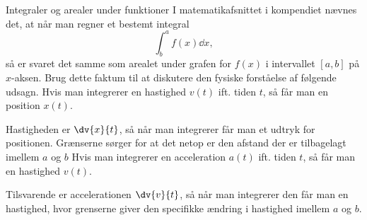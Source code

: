 %
\begin{opgave}{Integraler og arealer under funktioner}
I matematikafsnittet i kompendiet nævnes det, at når man regner et bestemt integral
\begin{equation*}
\int^a_b{f(x)}\dd{x},
\end{equation*}
så er svaret det samme som arealet under grafen for $f(x)$ i intervallet $[a,b]$ på $x$-aksen. Brug dette faktum til at diskutere den fysiske forståelse af følgende udsagn.
\opg Hvis man integrerer en hastighed $v(t)$ ift. tiden $t$, så får man en position $x(t)$.

Hastigheden er $\dv{x}{t}$, så når man integrerer får man et udtryk for positionen. Grænserne sørger for at det netop er den afstand der er tilbagelagt imellem $a$ og $b$
\opg Hvis man integrerer en acceleration $a(t)$ ift. tiden $t$, så får man en hastighed $v(t)$. 

Tilsvarende er accelerationen $\dv{v}{t}$, så når man integrerer den får man en hastighed, hvor grenserne giver den specifikke ændring i hastighed imellem $a$ og $b$.
\end{opgave}
